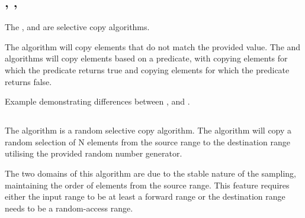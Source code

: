 \subsection{\texorpdfstring{, , }{\texttt{std::copy\_if}, \texttt{std::remove\_copy}, \texttt{std::remove\_copy\_if}}}

The ,  and  are selective copy algorithms.



The  algorithm will copy elements that do not match the provided value. The  and  algorithms will copy elements based on a predicate, with  copying elements for which the predicate returns true and  copying elements for which the predicate returns false.

\begin{box-note}
\footnotesize Example demonstrating differences between ,  and .
\tcblower
{}
\end{box-note}

\subsection{\texorpdfstring{}{\texttt{std::sample}}}

The  algorithm is a random selective copy algorithm. The algorithm will copy a random selection of N elements from the source range to the destination range utilising the provided random number generator.


The two domains of this algorithm are due to the stable nature of the sampling, maintaining the order of elements from the source range. This feature requires either the input range to be at least a forward range or the destination range needs to be a random-access range.

